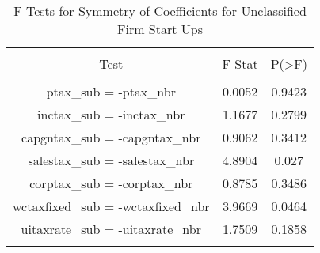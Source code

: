 
\begin{table}[!htbp] \centering 
  \caption{F-Tests for Symmetry of Coefficients for Unclassified Firm Start Ups} 
  \label{99Ftests} 
\begin{tabular}{@{\extracolsep{5pt}} ccc} 
\\[-1.8ex]\hline 
\hline \\[-1.8ex] 
Test & F-Stat & P(\textgreater F) \\ 
\hline \\[-1.8ex] 
ptax\_sub = -ptax\_nbr & 0.0052 & 0.9423 \\ 
inctax\_sub = -inctax\_nbr & 1.1677 & 0.2799 \\ 
capgntax\_sub = -capgntax\_nbr & 0.9062 & 0.3412 \\ 
salestax\_sub = -salestax\_nbr & 4.8904 & 0.027 \\ 
corptax\_sub = -corptax\_nbr & 0.8785 & 0.3486 \\ 
wctaxfixed\_sub = -wctaxfixed\_nbr & 3.9669 & 0.0464 \\ 
uitaxrate\_sub = -uitaxrate\_nbr & 1.7509 & 0.1858 \\ 
\hline \\[-1.8ex] 
\end{tabular} 
\end{table} 
